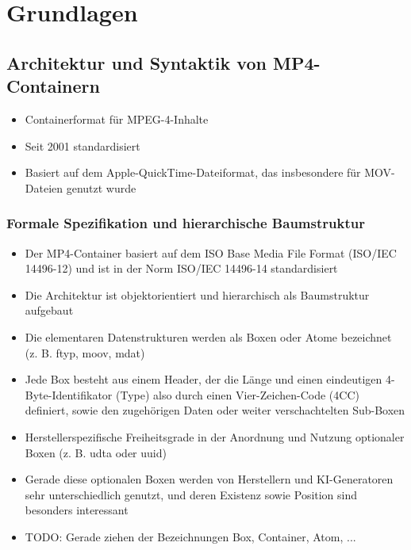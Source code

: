 

\chapter{Grundlagen}


\section{Architektur und Syntaktik von MP4-Containern}

\begin{itemize}
    \item  Containerformat für MPEG-4-Inhalte
    \item  Seit 2001 standardisiert
    \item Basiert auf dem Apple-QuickTime-Dateiformat, das insbesondere für MOV-Dateien genutzt wurde
\end{itemize}

\subsection{Formale Spezifikation und hierarchische Baumstruktur}

\begin{itemize}
    \item Der MP4-Container basiert auf dem ISO Base Media File Format (ISO/IEC 14496-12) und ist in der Norm ISO/IEC 14496-14 standardisiert \cite{iso_14496-14_2020}
    \item Die Architektur ist objektorientiert und hierarchisch als Baumstruktur aufgebaut
    \item Die elementaren Datenstrukturen werden als Boxen oder Atome bezeichnet (z. B. ftyp, moov, mdat)
    \item Jede Box besteht aus einem Header, der die Länge und einen eindeutigen 4-Byte-Identifikator (Type) also durch einen Vier-Zeichen-Code (4CC) definiert, sowie den zugehörigen Daten oder weiter verschachtelten Sub-Boxen
    \item Herstellerspezifische Freiheitsgrade in der Anordnung und Nutzung optionaler Boxen (z. B. udta oder uuid) 
    \item Gerade diese optionalen Boxen werden von Herstellern und KI-Generatoren sehr unterschiedlich genutzt, und deren Existenz sowie Position sind besonders interessant
    \item TODO: Gerade ziehen der Bezeichnungen Box, Container, Atom, ...
\end{itemize}

